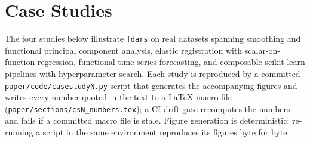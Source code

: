 \section{Case Studies}
\label{sec:casestudies}

The four studies below illustrate \texttt{fdars} on real datasets spanning
smoothing and functional principal component analysis, elastic registration
with scalar-on-function regression, functional time-series forecasting, and
composable scikit-learn pipelines with hyperparameter search.  Each study is
reproduced by a committed \texttt{paper/code/casestudyN.py} script that
generates the accompanying figures and writes every number quoted in the text
to a \LaTeX{} macro file (\texttt{paper/sections/csN\_numbers.tex}); a CI drift gate
recomputes the numbers and fails if a committed macro file is stale.  Figure
generation is deterministic: re-running a script in the same environment
reproduces its figures byte for byte.





